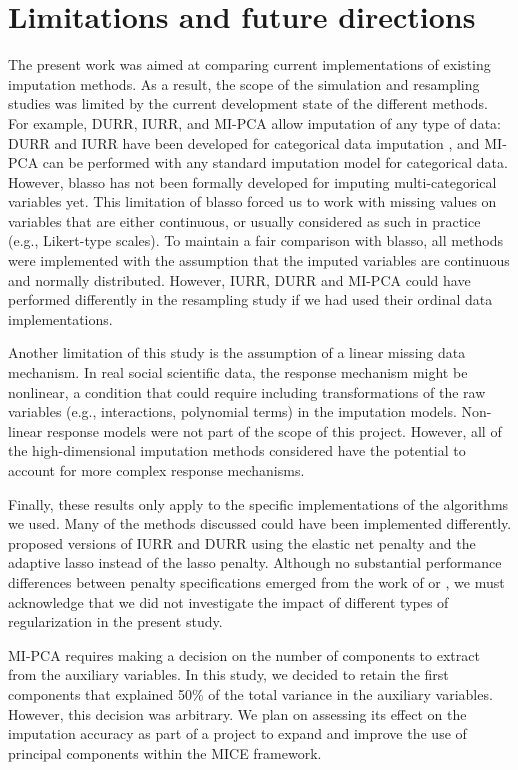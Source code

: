 \section{Limitations and future directions}

	The present work was aimed at comparing current implementations of existing imputation methods.
	As a result, the scope of the simulation and resampling studies was limited by the current development state of 
	the different methods.
	For example, DURR, IURR, and MI-PCA allow imputation of any type of data:
	DURR and IURR have been developed for categorical data imputation \citep{dengEtAl:2016},
	and MI-PCA can be performed with any standard imputation model for categorical data.
	However, blasso has not been formally developed for imputing multi-categorical variables yet. This limitation of blasso forced us to work with missing values on variables that are either continuous, or usually 
	considered as such in practice (e.g., Likert-type scales).
	To maintain a fair comparison with blasso, all methods were implemented with the assumption that the imputed 
	variables are continuous and normally distributed.
	However, IURR, DURR and MI-PCA could have performed differently in the resampling study if we had used their
	ordinal data implementations.

	Another limitation of this study is the assumption of a linear missing data mechanism.
	In real social scientific data, the response mechanism might be nonlinear, a condition that could require
	including transformations of the raw variables (e.g., interactions, polynomial terms) in the imputation models.
	Non-linear response models were not part of the scope of this project. 
	However, all of the high-dimensional imputation methods considered have the potential to account for more complex response mechanisms.

	Finally, these results only apply to the specific implementations of the algorithms we used. 
	Many of the methods discussed could have been implemented differently.
	\cite{zhaoLong:2016} proposed versions of IURR and DURR using the elastic net penalty \citep{zouHastie:2005} and 
	the adaptive lasso \citep{zou:2006} instead of the lasso penalty.
	Although no substantial performance differences between penalty specifications emerged 
	from the work of \cite{zhaoLong:2016} or \cite{dengEtAl:2016}, we must acknowledge that we did not investigate the impact of different types of
	regularization in the present study. 

	MI-PCA requires making a decision on the number of components to extract from the auxiliary 
	variables.
	In this study, we decided to retain the first components that explained 50\% of the total variance in the 
	auxiliary variables.
	However, this decision was arbitrary. 
	We plan on assessing its effect on the imputation accuracy as part of a project to 
	expand and improve the use of principal components within the MICE framework.

